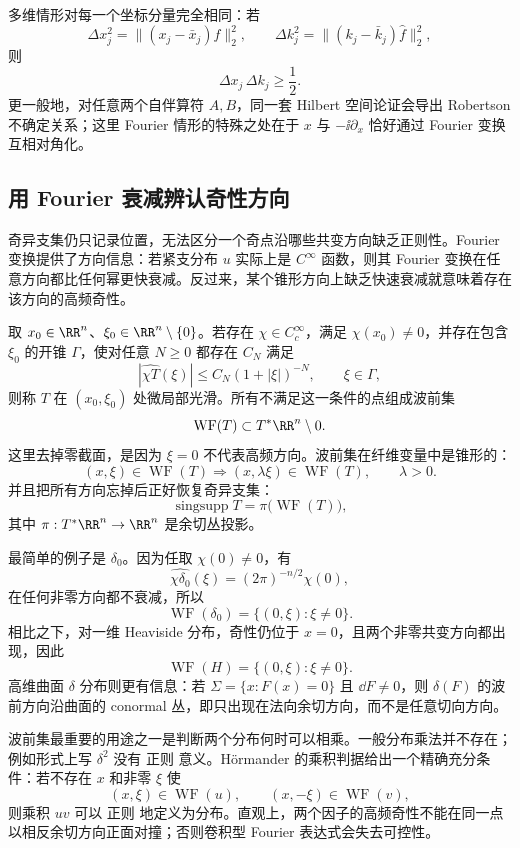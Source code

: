 多维情形对每一个坐标分量完全相同：若
\[
\Delta x_j^2
=\|(x_j-\bar x_j)f\|_2^2,
\qquad
\Delta k_j^2
=\|(k_j-\bar k_j)\widehat f\|_2^2,
\]
则
\[
\Delta x_j\,\Delta k_j\ge\frac12.
\]
更一般地，对任意两个自伴算符 $A,B$，同一套 Hilbert 空间论证会导出 Robertson 不确定关系；这里 Fourier 情形的特殊之处在于 $x$ 与 $-\ii\partial_x$ 恰好通过 Fourier 变换互相对角化。

\subsection{用 Fourier 衰减辨认奇性方向}

奇异支集仍只记录位置，无法区分一个奇点沿哪些共变方向缺乏正则性。Fourier 变换提供了方向信息：若紧支分布 $u$ 实际上是 $C^\infty$ 函数，则其 Fourier 变换在任意方向都比任何幂更快衰减。反过来，某个锥形方向上缺乏快速衰减就意味着存在该方向的高频奇性。

取 $x_0\in\RR^n$、$\xi_0\in\RR^n\setminus\{0\}$。若存在 $\chi\in C_c^\infty$，满足 $\chi(x_0)\neq0$，并存在包含 $\xi_0$ 的开锥 $\Gamma$，使对任意 $N\ge0$ 都存在 $C_N$ 满足
\[
{
|\widehat{\chi T}(\xi)|
\le C_N(1+|\xi|)^{-N},
\qquad \xi\in\Gamma
},
\]
则称 $T$ 在 $(x_0,\xi_0)$ 处微局部光滑。所有不满足这一条件的点组成波前集
\[
\operatorname{WF}(T)
\subset T^*\RR^n\setminus0.
\]
这里去掉零截面，是因为 $\xi=0$ 不代表高频方向。波前集在纤维变量中是锥形的：
\[
(x,\xi)\in\operatorname{WF}(T)
\Longrightarrow
(x,\lambda\xi)\in\operatorname{WF}(T),
\qquad \lambda>0.
\]
并且把所有方向忘掉后正好恢复奇异支集：
\[
{
\operatorname{singsupp}T
=
\pi\bigl(\operatorname{WF}(T)\bigr)
},
\]
其中 $\pi:T^*\RR^n\to\RR^n$ 是余切丛投影。

最简单的例子是 $\delta_0$。因为任取 $\chi(0)\neq0$，有
\[
\widehat{\chi\delta_0}(\xi)=(2\pi)^{-n/2}\chi(0),
\]
在任何非零方向都不衰减，所以
\[
\operatorname{WF}(\delta_0)
=\{(0,\xi):\xi\neq0\}.
\]
相比之下，对一维 Heaviside 分布，奇性仍位于 $x=0$，且两个非零共变方向都出现，因此
\[
\operatorname{WF}(H)
=\{(0,\xi):\xi\neq0\}.
\]
高维曲面 $\delta$ 分布则更有信息：若 $\Sigma=\{x:F(x)=0\}$ 且 $\dd F\neq0$，则 $\delta(F)$ 的波前方向沿曲面的 conormal 丛，即只出现在法向余切方向，而不是任意切向方向。

波前集最重要的用途之一是判断两个分布何时可以相乘。一般分布乘法并不存在；例如形式上写 $\delta^2$ 没有 正则 意义。Hörmander 的乘积判据给出一个精确充分条件：若不存在 $x$ 和非零 $\xi$ 使
\[
(x,\xi)\in\operatorname{WF}(u),
\qquad
(x,-\xi)\in\operatorname{WF}(v),
\]
则乘积 $uv$ 可以 正则 地定义为分布。直观上，两个因子的高频奇性不能在同一点以相反余切方向正面对撞；否则卷积型 Fourier 表达式会失去可控性。

